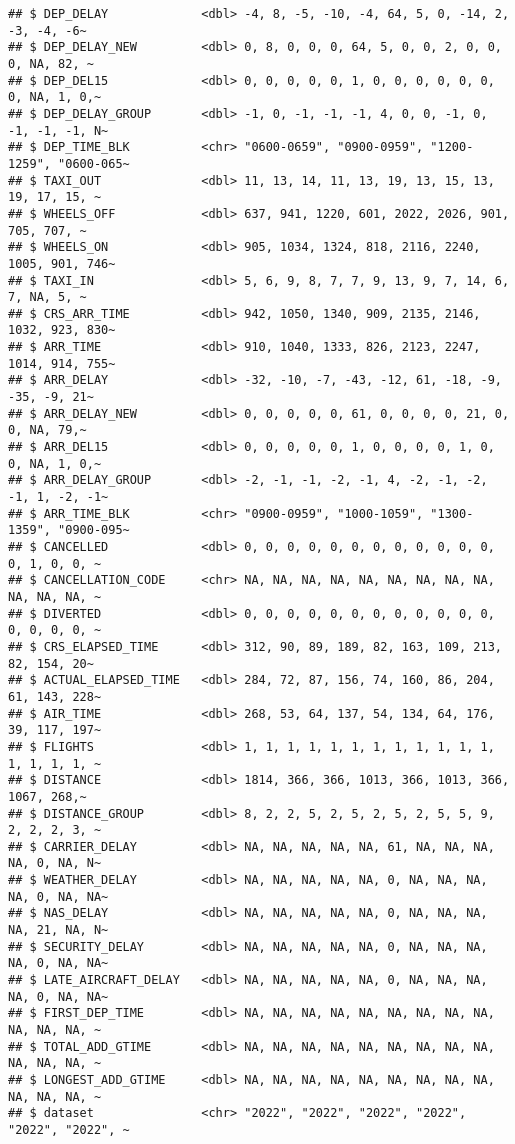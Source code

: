 \documentclass[
]{article}
\begin{document}
\begin{verbatim}
## $ DEP_DELAY             <dbl> -4, 8, -5, -10, -4, 64, 5, 0, -14, 2, -3, -4, -6~
## $ DEP_DELAY_NEW         <dbl> 0, 8, 0, 0, 0, 64, 5, 0, 0, 2, 0, 0, 0, NA, 82, ~
## $ DEP_DEL15             <dbl> 0, 0, 0, 0, 0, 1, 0, 0, 0, 0, 0, 0, 0, NA, 1, 0,~
## $ DEP_DELAY_GROUP       <dbl> -1, 0, -1, -1, -1, 4, 0, 0, -1, 0, -1, -1, -1, N~
## $ DEP_TIME_BLK          <chr> "0600-0659", "0900-0959", "1200-1259", "0600-065~
## $ TAXI_OUT              <dbl> 11, 13, 14, 11, 13, 19, 13, 15, 13, 19, 17, 15, ~
## $ WHEELS_OFF            <dbl> 637, 941, 1220, 601, 2022, 2026, 901, 705, 707, ~
## $ WHEELS_ON             <dbl> 905, 1034, 1324, 818, 2116, 2240, 1005, 901, 746~
## $ TAXI_IN               <dbl> 5, 6, 9, 8, 7, 7, 9, 13, 9, 7, 14, 6, 7, NA, 5, ~
## $ CRS_ARR_TIME          <dbl> 942, 1050, 1340, 909, 2135, 2146, 1032, 923, 830~
## $ ARR_TIME              <dbl> 910, 1040, 1333, 826, 2123, 2247, 1014, 914, 755~
## $ ARR_DELAY             <dbl> -32, -10, -7, -43, -12, 61, -18, -9, -35, -9, 21~
## $ ARR_DELAY_NEW         <dbl> 0, 0, 0, 0, 0, 61, 0, 0, 0, 0, 21, 0, 0, NA, 79,~
## $ ARR_DEL15             <dbl> 0, 0, 0, 0, 0, 1, 0, 0, 0, 0, 1, 0, 0, NA, 1, 0,~
## $ ARR_DELAY_GROUP       <dbl> -2, -1, -1, -2, -1, 4, -2, -1, -2, -1, 1, -2, -1~
## $ ARR_TIME_BLK          <chr> "0900-0959", "1000-1059", "1300-1359", "0900-095~
## $ CANCELLED             <dbl> 0, 0, 0, 0, 0, 0, 0, 0, 0, 0, 0, 0, 0, 1, 0, 0, ~
## $ CANCELLATION_CODE     <chr> NA, NA, NA, NA, NA, NA, NA, NA, NA, NA, NA, NA, ~
## $ DIVERTED              <dbl> 0, 0, 0, 0, 0, 0, 0, 0, 0, 0, 0, 0, 0, 0, 0, 0, ~
## $ CRS_ELAPSED_TIME      <dbl> 312, 90, 89, 189, 82, 163, 109, 213, 82, 154, 20~
## $ ACTUAL_ELAPSED_TIME   <dbl> 284, 72, 87, 156, 74, 160, 86, 204, 61, 143, 228~
## $ AIR_TIME              <dbl> 268, 53, 64, 137, 54, 134, 64, 176, 39, 117, 197~
## $ FLIGHTS               <dbl> 1, 1, 1, 1, 1, 1, 1, 1, 1, 1, 1, 1, 1, 1, 1, 1, ~
## $ DISTANCE              <dbl> 1814, 366, 366, 1013, 366, 1013, 366, 1067, 268,~
## $ DISTANCE_GROUP        <dbl> 8, 2, 2, 5, 2, 5, 2, 5, 2, 5, 5, 9, 2, 2, 2, 3, ~
## $ CARRIER_DELAY         <dbl> NA, NA, NA, NA, NA, 61, NA, NA, NA, NA, 0, NA, N~
## $ WEATHER_DELAY         <dbl> NA, NA, NA, NA, NA, 0, NA, NA, NA, NA, 0, NA, NA~
## $ NAS_DELAY             <dbl> NA, NA, NA, NA, NA, 0, NA, NA, NA, NA, 21, NA, N~
## $ SECURITY_DELAY        <dbl> NA, NA, NA, NA, NA, 0, NA, NA, NA, NA, 0, NA, NA~
## $ LATE_AIRCRAFT_DELAY   <dbl> NA, NA, NA, NA, NA, 0, NA, NA, NA, NA, 0, NA, NA~
## $ FIRST_DEP_TIME        <dbl> NA, NA, NA, NA, NA, NA, NA, NA, NA, NA, NA, NA, ~
## $ TOTAL_ADD_GTIME       <dbl> NA, NA, NA, NA, NA, NA, NA, NA, NA, NA, NA, NA, ~
## $ LONGEST_ADD_GTIME     <dbl> NA, NA, NA, NA, NA, NA, NA, NA, NA, NA, NA, NA, ~
## $ dataset               <chr> "2022", "2022", "2022", "2022", "2022", "2022", ~
\end{verbatim}
\end{document}
